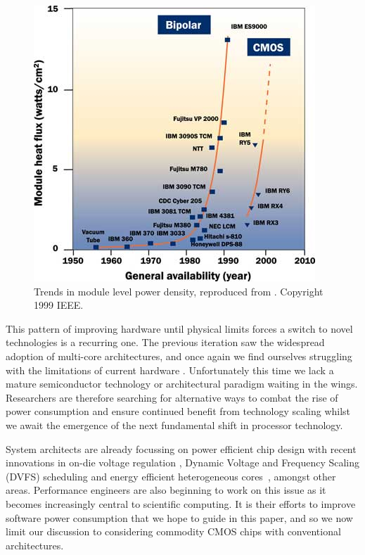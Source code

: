 \begin{figure}[ht]
\centering
\includegraphics[width=0.9\linewidth]{Images/bipolarcmos.jpg}
\caption{Trends in module level power density, reproduced from \cite{chu:1999aa}. Copyright 1999 IEEE.}
\end{figure}
This pattern of improving hardware until physical limits forces a switch to novel technologies is a recurring one. The previous iteration saw the widespread adoption of multi-core architectures, and once again we find ourselves struggling with the limitations of current hardware \cite{esmaeilzadeh:2011aa}. Unfortunately this time we lack a mature semiconductor technology or architectural paradigm waiting in the wings. Researchers are therefore searching for alternative ways to combat the rise of power consumption and ensure continued benefit from technology scaling whilst we await the emergence of the next fundamental shift in processor technology. \golden

System architects are already focussing on power efficient chip design with recent innovations in on-die voltage regulation \cite{burton:2014aa}, Dynamic Voltage and Frequency Scaling (DVFS) scheduling \cite{kwon:2013aa} and energy efficient heterogeneous cores~\cite{gupta:2012aa}, amongst other areas. Performance engineers are also beginning to work on this issue as it becomes increasingly central to scientific computing. It is their efforts to improve software power consumption that we hope to guide in this paper, and so we now limit our discussion to considering commodity CMOS chips with conventional architectures.

